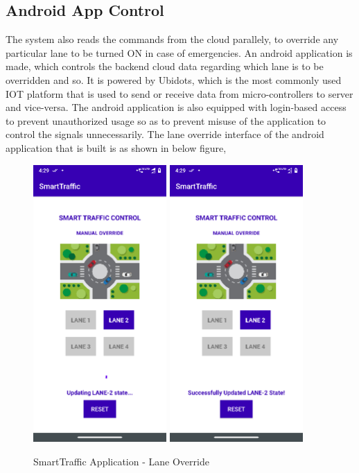 \pagebreak

\subsection{Android App Control}

The system also reads the commands from the cloud parallely, to override any particular lane to be turned ON in case of emergencies. An android application is made, which controls the backend cloud data regarding which lane is to be overridden and so. It is powered by Ubidots, which is the most commonly used IOT platform that is used to send or receive data from micro-controllers to server and vice-versa. The android application is also equipped with login-based access to prevent unauthorized usage so as to prevent misuse of the application to control the signals unnecessarily. The lane override interface of the android application that is built is as shown in below figure,

\begin{figure}[h]\centering
        \includegraphics[width=2in]{./images/LaneOverride2.png}
        \includegraphics[width=2in]{./images/LaneOverride3.png}
	\caption{SmartTraffic Application - Lane Override}\label{LaneOverrideInterface}
\end{figure}


\pagebreak
